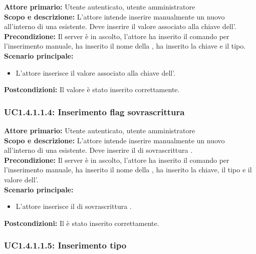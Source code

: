 \documentclass{scalatekids-article}
\begin{document}
\textbf{Attore primario:} Utente autenticato, utente amministratore\\
\textbf{Scopo e descrizione:} L'attore intende inserire manualmente un nuovo  all'interno di una  esistente. Deve inserire il valore associato alla chiave dell'.\\
\textbf{Precondizione:} Il server è in ascolto, l'attore ha inserito il comando per l'inserimento  manuale, ha inserito il nome della , ha inserito la chiave e il tipo.\\
\textbf{Scenario principale:}
\begin{itemize}
\item L'attore inserisce il valore associato alla chiave dell'.
\end{itemize}
\textbf{Postcondizioni:} Il valore è stato inserito correttamente.

\subsubsection{UC1.4.1.1.4: Inserimento flag sovrascrittura}

\textbf{Attore primario:} Utente autenticato, utente amministratore\\
\textbf{Scopo e descrizione:} L'attore intende inserire manualmente un nuovo  all'interno di una  esistente. Deve inserire il  di sovrascrittura .\\
\textbf{Precondizione:} Il server è in ascolto, l'attore ha inserito il comando per l'inserimento  manuale, ha inserito il nome della , ha inserito la chiave, il tipo e il valore dell'.\\
\textbf{Scenario principale:}
\begin{itemize}
\item L'attore inserisce il  di sovrascrittura . %
\end{itemize}
\textbf{Postcondizioni:} Il  è stato inserito correttamente.

\subsubsection{UC1.4.1.1.5: Inserimento tipo}
\end{document}
